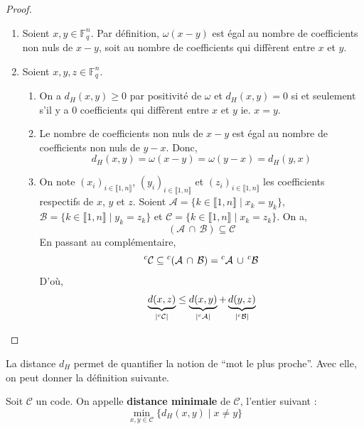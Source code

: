   \begin{proof}
    \begin{enumerate}[label={\bfseries(\roman*)}]
      \item Soient $x, y \in \mathbb{F}_q^n$. Par définition, $\omega(x-y)$ est égal au nombre de coefficients non nuls de $x-y$, soit au nombre de coefficients qui diffèrent entre $x$ et $y$.
      \item Soient $x, y, z \in \mathbb{F}_q^n$.
      \begin{enumerate}
        \item On a $d_H(x,y) \geq 0$ par positivité de $\omega$ et $d_H(x,y) = 0$ si et seulement s'il y a $0$ coefficients qui diffèrent entre $x$ et $y$ ie. $x = y$.
        \item Le nombre de coefficients non nuls de $x-y$ est égal au nombre de coefficients non nuls de $y-x$. Donc,
        \[ d_H(x,y) = \omega(x-y) = \omega(y-x) = d_H(y,x) \]
        \item On note $(x_i)_{i \in \llbracket 1, n \rrbracket}$, $(y_i)_{i \in \llbracket 1, n \rrbracket}$ et $(z_i)_{i \in \llbracket 1, n \rrbracket}$ les coefficients respectifs de $x$, $y$ et $z$. Soient $\mathcal{A} = \{ k \in \llbracket 1, n \rrbracket \mid x_k = y_k \}$, $\mathcal{B} = \{ k \in \llbracket 1, n \rrbracket \mid y_k = z_k \}$ et $\mathcal{C} = \{ k \in \llbracket 1, n \rrbracket \mid x_k = z_k \}$. On a,
        \[ (\mathcal{A} \, \cap \, \mathcal{B}) \subseteq \mathcal{C} \]
        En passant au complémentaire,
        \[ \mathstrut ^c\mathcal{C} \subseteq \mathstrut ^c(\mathcal{A} \, \cap \, \mathcal{B}) = \mathstrut ^c \mathcal{A} \, \cup \, \mathstrut ^c \mathcal{B} \]
        D'où,
        \[ \underbrace{d(x,z)}_{|\mathstrut ^c\mathcal{C}|} \leq \underbrace{d(x,y)}_{|\mathstrut ^c\mathcal{A}|} + \underbrace{d(y,z)}_{|\mathstrut ^c\mathcal{B}|} \]
      \end{enumerate}
    \end{enumerate}
  \end{proof}

  La distance $d_H$ permet de quantifier la notion de ``mot le plus proche''. Avec elle, on peut donner la définition suivante.

  \begin{definition}
    Soit $\mathcal{C}$ un code. On appelle \textbf{distance minimale} de $\mathcal{C}$, l'entier suivant :
    \[ \min_{x,y \in \mathcal{C}} \{ d_H(x,y) \mid x \neq y \} \]
  \end{definition}

